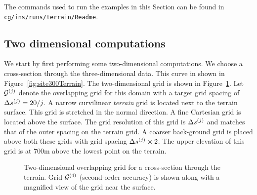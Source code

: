 \documentclass[11pt]{article}
\begin{document}
The commands used to run the examples in this Section can be found in {\tt cg/ins/runs/terrain/Readme}.


\newcommand{\dsj}{\ds^{(j)}}
\subsection{Two dimensional computations}

We start by first performing some two-dimensional computations. We choose a cross-section through
the three-dimensional data. This curve in shown in Figure~\ref{fig:site300Terrain}.
The two-dimensional grid is shown in Figure~\ref{fig:site300Grid2d}.
Let ${\mathcal G}^{(j)}$ denote the overlapping grid for this domain with a target grid spacing of $\dsj=20/j$. 
A narrow curvilinear {\em terrain} grid is located next to the terrain surface. This grid is stretched in
the normal direction. A fine Cartesian grid is located above the surface. The grid resolution of this
grid is $\dsj$ and matches that of the outer spacing on the terrain grid. A coarser back-ground grid is placed above both
these grids with grid spacing $\dsj \times 2$. The upper elevation of this grid is at $700$m above the lowest point on
the terrain.


{
\begin{figure}[hbt]
\newcommand{\figWidth}{13cm}
\newcommand{\trimfig}[2]{\trimFig{#1}{#2}{0.025}{.025}{.25}{.25}}
\newcommand{\figWidtha}{7cm}
\newcommand{\trimfiga}[2]{\trimFigb{#1}{#2}{0.0}{.0}{.5}{.1}}
\begin{center}\small
\caption{Two-dimensional overlapping grid for a cross-section through the terrain. Grid ${\mathcal G}^{(4)}$ (second-order accuracy) is shown
   along with a magnified view of the grid near the surface.}
\label{fig:site300Grid2d}
\end{center}
\end{figure}
}
\end{document}
